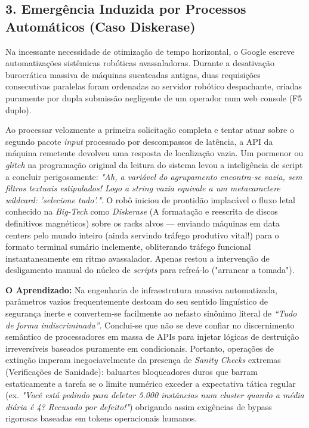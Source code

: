 \documentclass[12pt,a4paper]{report}
\begin{document}
\subsection{3. Emergência Induzida por Processos Automáticos (Caso Diskerase)}
Na incessante necessidade de otimização de tempo horizontal, o Google escreve automatizações sistêmicas robóticas avassaladoras. Durante a desativação burocrática massiva de máquinas sucateadas antigas, duas requisições consecutivas paralelas foram ordenadas ao servidor robótico despachante, criadas puramente por dupla submissão negligente de um operador num web console (F5 duplo).

Ao processar velozmente a primeira solicitação completa e tentar atuar sobre o segundo pacote \textit{input} processado por descompassos de latência, a API da máquina remetente devolveu uma resposta de localização vazia. Um pormenor ou \textit{glitch} na programação original da leitura do sistema levou a inteligência de script a concluir perigosamente: \textit{"Ah, a variável do agrupamento encontra-se vazia, sem filtros textuais estipulados! Logo a string vazia equivale a um metacaractere \textit{wildcard}: 'selecione tudo'."}.
O robô iniciou de prontidão implacável o fluxo letal conhecido na \textit{Big-Tech} como \textit{Diskerase} (A formatação e reescrita de discos definitivos magnéticos) sobre os racks alvos — enviando máquinas em data centers pelo mundo inteiro (ainda servindo tráfego produtivo vital!)  para o formato terminal sumário inclemente, obliterando tráfego funcional instantaneamente em ritmo avassalador. Apenas restou a intervenção de desligamento manual do núcleo de \textit{scripts} para refreá-lo ("arrancar a tomada").

\textbf{O Aprendizado:} Na engenharia de infraestrutura massiva automatizada, parâmetros vazios frequentemente destoam do seu sentido linguístico de segurança inerte e convertem-se facilmente ao nefasto sinônimo literal de \textit{“Tudo de forma indiscriminada”}. Conclui-se que não se deve confiar no discernimento semântico de processadores em massa de APIs para injetar lógicas de destruição irreversíveis baseados puramente em condicionais. Portanto, operações de extinção imperam inegociavelmente da presença de \textit{Sanity Checks} extremas (Verificações de Sanidade): baluartes bloqueadores duros que barram estaticamente a tarefa se o limite numérico exceder a expectativa tática regular (ex. \textit{"Você está pedindo para deletar 5.000 instâncias num cluster quando a média diária é 4? Recusado por defeito!"}) obrigando assim exigências de bypass rigorosas baseadas em tokens operacionais humanos.
\end{document}

